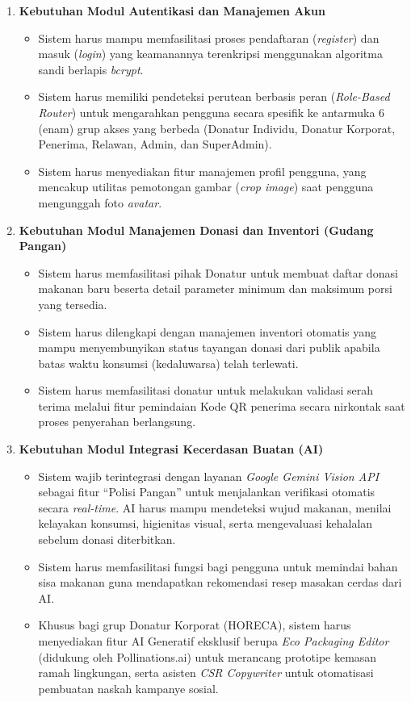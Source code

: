 \begin{enumerate}
    \item \textbf{Kebutuhan Modul Autentikasi dan Manajemen Akun}
    \begin{itemize}
        \item Sistem harus mampu memfasilitasi proses pendaftaran (\textit{register}) dan masuk (\textit{login}) yang keamanannya terenkripsi menggunakan algoritma sandi berlapis \textit{bcrypt}.
        \item Sistem harus memiliki pendeteksi perutean berbasis peran (\textit{Role-Based Router}) untuk mengarahkan pengguna secara spesifik ke antarmuka 6 (enam) grup akses yang berbeda (Donatur Individu, Donatur Korporat, Penerima, Relawan, Admin, dan SuperAdmin).
        \item Sistem harus menyediakan fitur manajemen profil pengguna, yang mencakup utilitas pemotongan gambar (\textit{crop image}) saat pengguna mengunggah foto \textit{avatar}.
    \end{itemize}

    \item \textbf{Kebutuhan Modul Manajemen Donasi dan Inventori (Gudang Pangan)}
    \begin{itemize}
        \item Sistem harus memfasilitasi pihak Donatur untuk membuat daftar donasi makanan baru beserta detail parameter minimum dan maksimum porsi yang tersedia.
        \item Sistem harus dilengkapi dengan manajemen inventori otomatis yang mampu menyembunyikan status tayangan donasi dari publik apabila batas waktu konsumsi (kedaluwarsa) telah terlewati.
        \item Sistem harus memfasilitasi donatur untuk melakukan validasi serah terima melalui fitur pemindaian Kode QR penerima secara nirkontak saat proses penyerahan berlangsung.
    \end{itemize}

    \item \textbf{Kebutuhan Modul Integrasi Kecerdasan Buatan (AI)}
    \begin{itemize}
        \item Sistem wajib terintegrasi dengan layanan \textit{Google Gemini Vision API} sebagai fitur ``Polisi Pangan'' untuk menjalankan verifikasi otomatis secara \textit{real-time}. AI harus mampu mendeteksi wujud makanan, menilai kelayakan konsumsi, higienitas visual, serta mengevaluasi kehalalan sebelum donasi diterbitkan.
        \item Sistem harus memfasilitasi fungsi bagi pengguna untuk memindai bahan sisa makanan guna mendapatkan rekomendasi resep masakan cerdas dari AI.
        \item Khusus bagi grup Donatur Korporat (HORECA), sistem harus menyediakan fitur AI Generatif eksklusif berupa \textit{Eco Packaging Editor} (didukung oleh Pollinations.ai) untuk merancang prototipe kemasan ramah lingkungan, serta asisten \textit{CSR Copywriter} untuk otomatisasi pembuatan naskah kampanye sosial.
    \end{itemize}


\end{enumerate}

